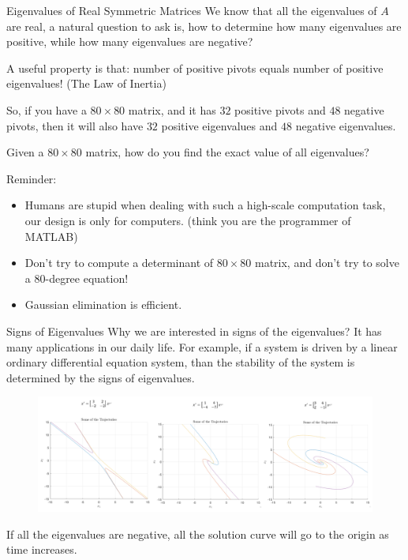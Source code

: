 \documentclass{beamer}
\begin{document}
\begin{frame}{Eigenvalues of Real Symmetric Matrices}
We know that all the eigenvalues of $A$ are real, a natural question to ask is, how to determine how many eigenvalues are positive, while how many eigenvalues are negative?

\vspace{3pt}
A useful property is that: number of positive pivots equals number of positive eigenvalues! (The Law of Inertia)

\vspace{3pt}
So, if you have a $80\times 80$ matrix, and it has $32$ positive pivots and $48$ negative pivots, then it will also have $32$ positive eigenvalues and $48$ negative eigenvalues.

\vspace{3pt}
Given a $80\times 80$ matrix, how do you find the exact value of all eigenvalues?

Reminder:
\begin{itemize}
    \item Humans are stupid when dealing with such a high-scale computation task, our design is only for computers. (think you are the programmer of MATLAB)
    \item Don't try to compute a determinant of $80\times 80$ matrix, and don't try to solve a $80$-degree equation!
    \item Gaussian elimination is efficient.
\end{itemize}
\end{frame}

\vspace{3pt}
\begin{frame}{Signs of Eigenvalues}
Why we are interested in signs of the eigenvalues? It has many applications in our daily life. For example, if a system is driven by a linear ordinary differential equation system, than the stability of the system is determined by the signs of eigenvalues.
\begin{figure}
\centering
\includegraphics[width=\textwidth]{ode.jpg}
\end{figure}
If all the eigenvalues are negative, all the solution curve will go to the origin as time increases.
\end{frame}
\end{document}
